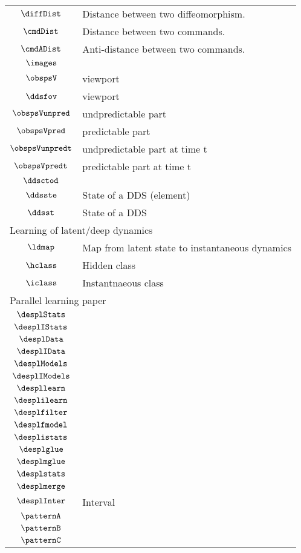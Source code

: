 \begin{longtable}{cl}
 $\diffDist$ &  Distance between two diffeomorphism.\\ 
 $\cmdDist$ &  Distance between two commands.\\ 
 $\cmdADist$ &  Anti-distance between two commands.\\ 
 $\images$ & \\ 
 $\obspsV$ &  viewport\\ 
 $\ddsfov$ &  viewport\\ 
 $\obspsVunpred$ &  undpredictable part\\ 
 $\obspsVpred$ &  predictable part \\ 
 $\obspsVunpredt$ &  undpredictable part at time t\\ 
 $\obspsVpredt$ &  predictable part at time t\\ 
 $\ddsctod$ & \\ 
 $\ddsste$ &  State of a DDS (element)\\ 
 $\ddsst$ &  State of a DDS\\ 
 \multicolumn{2}{l}{Learning of latent/deep dynamics}\\ 
 \hline
$\ldmap$ &  Map from latent state to instantaneous dynamics\\ 
 $\hclass$ &  Hidden class\\ 
 $\iclass$ &  Instantnaeous class\\ 
 \multicolumn{2}{l}{Parallel learning paper}\\ 
 \hline
$\desplStats$ & \\ 
 $\desplIStats$ & \\ 
 $\desplData$ & \\ 
 $\desplIData$ & \\ 
 $\desplModels$ & \\ 
 $\desplIModels$ & \\ 
 $\despllearn$ & \\ 
 $\desplilearn$ & \\ 
 $\desplfilter$ & \\ 
 $\desplfmodel$ & \\ 
 $\desplistats$ & \\ 
 $\desplglue$ & \\ 
 $\desplmglue$ & \\ 
 $\desplstats$ & \\ 
 $\desplmerge$ & \\ 
 $\desplInter$ &  Interval\\ 
 $\patternA$ & \\ 
 $\patternB$ & \\ 
 $\patternC$ & \\ 

\end{longtable}
